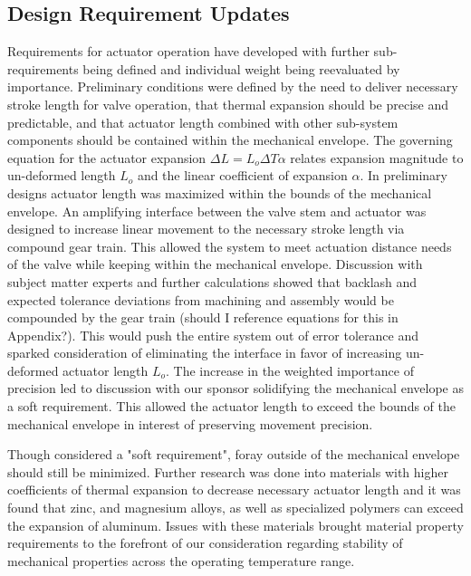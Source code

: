 \documentclass[12pt, letterpaper]{report}%
\newcounter{mycounter}           %
\newcounter{sub}[mycounter]      %
\begin{document}
        \subsection{Design Requirement Updates}
        \label{subsec:act_spec_3}

         Requirements for actuator operation have developed with further sub-requirements being 
        defined and individual weight being reevaluated by importance. Preliminary 
        conditions were defined by the need to deliver necessary stroke length for valve operation, 
        that thermal expansion
        should be precise and predictable, and that actuator length combined with other sub-system
        components should be contained within the mechanical envelope. The governing equation for
        the actuator expansion $\Delta L = L_o\Delta T\alpha $ relates expansion magnitude to 
        un-deformed length $L_o$ and the linear coefficient of expansion $\alpha$. In preliminary 
        designs actuator length was maximized within the bounds of the mechanical envelope. 
        An amplifying interface between the valve stem and actuator was designed to increase 
        linear movement to the necessary stroke length via compound gear train. This allowed the
        system to meet actuation distance needs of the valve while keeping within the mechanical 
        envelope. Discussion with subject matter experts and further calculations 
        showed that backlash and expected tolerance deviations from machining and assembly would
        be compounded by the gear train (should I reference equations for this in Appendix?). 
        This would push the entire system out of error tolerance and 
        sparked consideration of eliminating the interface in favor of increasing un-deformed actuator
        length $L_o$. The increase in the weighted importance of precision led to discussion with
        our sponsor solidifying the mechanical envelope as a soft requirement. This allowed the actuator
        length to exceed the bounds of the mechanical envelope in interest of preserving movement precision.

        Though considered a "soft requirement", foray outside of the mechanical envelope should still 
        be minimized. Further research was done into materials with higher coefficients of thermal 
        expansion to decrease necessary actuator length and it was found that zinc, and magnesium alloys,
        as well as specialized polymers can exceed the expansion of aluminum. 
        Issues with these materials brought material property requirements
        to the forefront of our consideration regarding stability of mechanical properties across the operating temperature
        range. 
\end{document}
